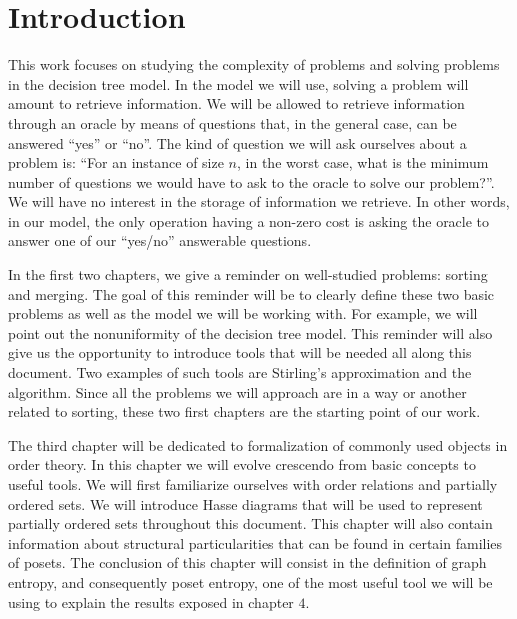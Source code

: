 \chapter*{Introduction}
%

This work focuses on studying the complexity of problems and solving problems
in the decision tree model. In the model we will use, solving a problem will
amount to retrieve information. We will be allowed to retrieve information
through an oracle by means of questions that, in the general case,
can be answered ``yes'' or ``no''. The kind of question we will ask ourselves
about a problem is: ``For an instance of size \(n\), in the worst case, what is
the minimum number of questions we would have to ask to the oracle to solve our
problem?''. We will have no interest in the storage of information we retrieve.
In other words, in our model, the only operation having a non-zero cost is
asking the oracle to answer one of our ``yes/no'' answerable questions.

In the first two chapters, we give a reminder on well-studied problems:
sorting and merging. The goal of this reminder will be to clearly define these
two basic problems as well as the model we will be working with. For example,
we will point out the nonuniformity of the decision tree model. This reminder
will also give us the opportunity to introduce tools that will be needed all along
this document. Two examples of such tools are Stirling's approximation and the
\mergesort algorithm. Since all the problems we will approach are in a way or
another related to sorting, these two first chapters are the starting point of
our work.

The third chapter will be dedicated to formalization of commonly used objects
in order theory. In this chapter we will evolve crescendo from basic
concepts to useful tools. We will first familiarize ourselves with order
relations and partially ordered sets. We will introduce Hasse diagrams that
will be used to represent partially ordered sets throughout this document.
This chapter will also contain information about structural particularities
that can be found in certain families of posets. The conclusion of this
chapter will consist in the definition of graph entropy, and consequently
poset entropy, one of the most useful tool we will be using to explain the
results exposed in chapter \(4\).

